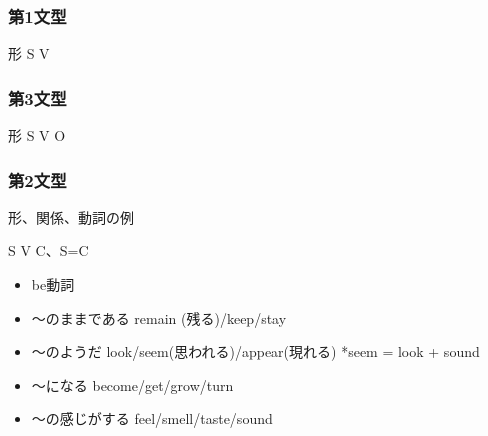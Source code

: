\documentclass[10pt]{jsarticle}
\newcommand{\answer}[2]{{\color{orange}#2}}
\newcommand{\question}[2]{{\color{orange}#2}}
\newcommand{\answer}[2]{\vspace{#1mm}}
\newcommand{\question}[2]{#1}
\begin{document}
\begin{multicols}{2}
	\subsubsection*{第1文型}
	\begin{itembox}[l]{形}
		\answer{6}{S V}
	\end{itembox}


	\subsubsection*{第3文型}
	\begin{itembox}[l]{形}
		\answer{6}{S V O}
	\end{itembox}

\end{multicols}
\vspace{-5mm}

\subsubsection*{第2文型}
\begin{itembox}[l]{形、関係、動詞の例}
	\answer{6}{
		S V C、S=C
		\begin{itemize}
			\item be動詞
			\item 〜のままである remain (残る)/keep/stay
			\item 〜のようだ look/seem(思われる)/appear(現れる) *seem = look + sound
			\item 〜になる become/get/grow/turn
			\item 〜の感じがする feel/smell/taste/sound
		\end{itemize}
	}
\end{itembox}
\question{
	\begin{itembox}[l]{動詞}
		\begin{multicols}{3}
			\begin{itemize}
				\item look \answer{5}{}
				\item sound \answer{5}{}
				\item seem \answer{5}{}
				\item taste \answer{5}{}
				\item keep \answer{5}{}
				\item become \answer{5}{}
				\item smell \answer{5}{}
				\item get \answer{5}{}
			\end{itemize}
		\end{multicols}
	\end{itembox}
}{}
\end{document}
